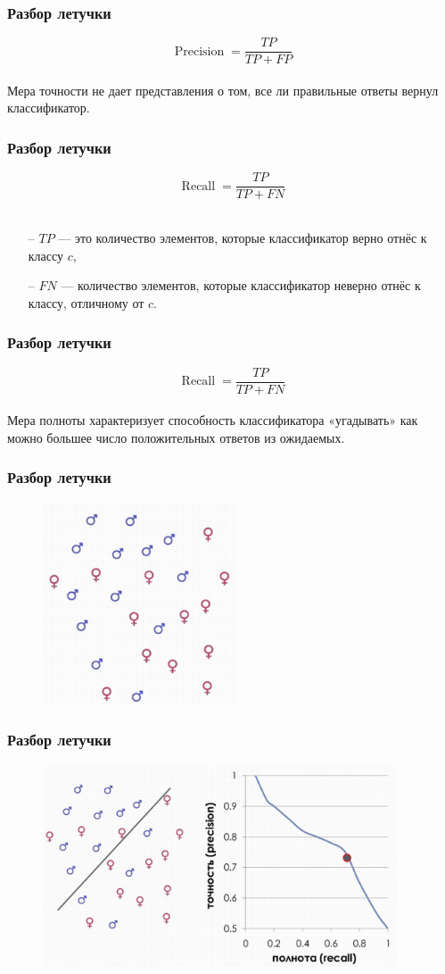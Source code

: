 \documentclass[12pt]{beamer}
\begin{document}
\begin{frame}\frametitle{Разбор летучки}
$$\operatorname{Precision} = \frac{TP}{TP + FP}$$\\
\vspace{5mm}
Мера точности не дает представления о том, все ли правильные ответы вернул классификатор.
\end{frame}

\begin{frame}\frametitle{Разбор летучки}
$$\operatorname{Recall} = \frac{TP}{TP + FN}$$\\
\begin{itemize}
\item[--] $TP$ --- это количество элементов, которые классификатор верно отнёс к классу $c$,
\item[--] $FN$ --- количество элементов, которые классификатор неверно отнёс к классу, отличному от $c$.
\end{itemize}
\end{frame}

\begin{frame}\frametitle{Разбор летучки}
$$\operatorname{Recall} = \frac{TP}{TP + FN}$$\\
\vspace{5mm}
Мера полноты характеризует способность классификатора «угадывать» как можно большее число положительных ответов из ожидаемых. 
\end{frame}

\begin{frame}\frametitle{Разбор летучки}
\begin{figure}[htbp]
\centering
\includegraphics[height=170pt]{images/precision-recall}  
\end{figure}
\end{frame}

\begin{frame}\frametitle{Разбор летучки}
\begin{figure}[htbp]
\centering
\includegraphics[height=170pt]{images/precision-recall-1}  
\end{figure}
\end{frame}
\end{document}
